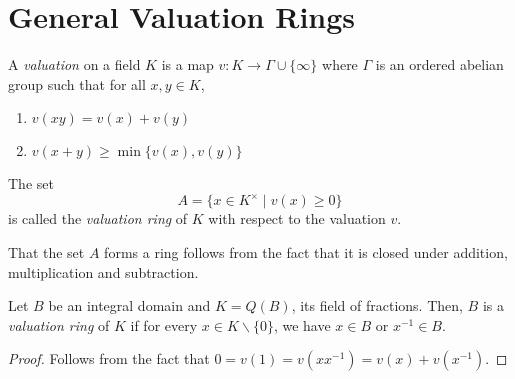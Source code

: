 \section{General Valuation Rings}

\begin{definition}[Valuation]
    A \emph{valuation} on a field $K$ is a map $v: K\to\Gamma\cup\{\infty\}$ where $\Gamma$ is an ordered abelian group such that for all $x,y\in K$,
    \begin{enumerate}
        \item $v(xy) = v(x) + v(y)$
        \item $v(x + y)\ge\min\{v(x), v(y)\}$
    \end{enumerate}
    The set 
    \begin{equation*}
        A = \{x\in K^\times\mid v(x)\ge 0\}
    \end{equation*}
    is called the \emph{valuation ring} of $K$ with respect to the valuation $v$.
\end{definition}

That the set $A$ forms a ring follows from the fact that it is closed under addition, multiplication and subtraction.

\begin{proposition}
    Let $B$ be an integral domain and $K = Q(B)$, its field of fractions. Then, $B$ is a \emph{valuation ring} of $K$ if for every $x\in K\backslash\{0\}$, we have $x\in B$ or $x^{-1}\in B$.
\end{proposition}
\begin{proof}
    Follows from the fact that $0 = v(1) = v(xx^{-1}) = v(x) + v(x^{-1})$.
\end{proof}

